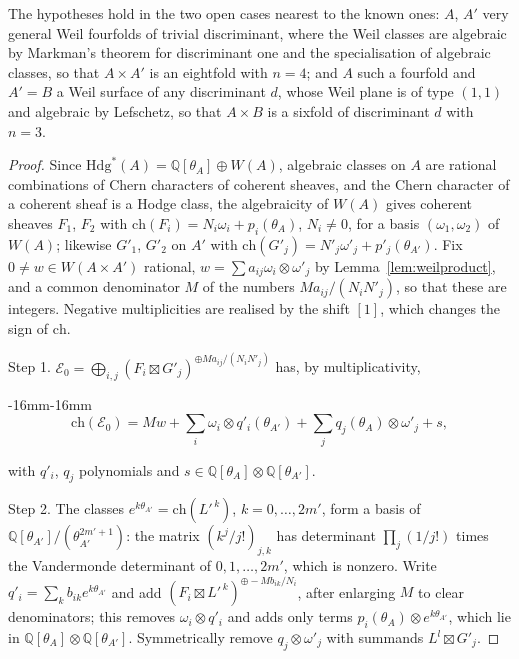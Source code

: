 \documentclass[11pt,reqno]{amsart}
\newenvironment{widetext}{\begin{adjustwidth}{-16mm}{-16mm}}{\end{adjustwidth}}
\numberwithin{equation}{section}
\theoremstyle{plain}
\theoremstyle{definition}
\newcommand{\QQ}{\mathbb{Q}}
\newcommand{\Hdg}{\mathrm{Hdg}}
\newcommand{\ch}{\mathrm{ch}}
\begin{document}
The hypotheses hold in the two open cases nearest to the known ones: $A$, $A'$ very general Weil fourfolds of trivial discriminant, where the Weil classes are algebraic by Markman's theorem for discriminant one \cite{Mar23} and the specialisation of algebraic classes, so that $A\times A'$ is an eightfold with $n=4$; and $A$ such a fourfold and $A'=B$ a Weil surface of any discriminant $d$, whose Weil plane is of type $(1,1)$ and algebraic by Lefschetz, so that $A\times B$ is a sixfold of discriminant $d$ with $n=3$.

\begin{proof}
Since $\Hdg^{*}(A)=\QQ[\theta_{A}]\oplus W(A)$, algebraic classes on $A$ are rational combinations of Chern characters of coherent sheaves, and the Chern character of a coherent sheaf is a Hodge class, the algebraicity of $W(A)$ gives coherent sheaves $F_{1}$, $F_{2}$ with $\ch(F_{i})=N_{i}\omega_{i}+p_{i}(\theta_{A})$, $N_{i}\ne0$, for a basis $(\omega_{1},\omega_{2})$ of $W(A)$; likewise $G'_{1}$, $G'_{2}$ on $A'$ with $\ch(G'_{j})=N'_{j}\omega'_{j}+p'_{j}(\theta_{A'})$. Fix $0\ne w\in W(A\times A')$ rational, $w=\sum a_{ij}\omega_{i}\otimes\omega'_{j}$ by Lemma~\ref{lem:weilproduct}, and a common denominator $M$ of the numbers $Ma_{ij}/(N_{i}N'_{j})$, so that these are integers. Negative multiplicities are realised by the shift $[1]$, which changes the sign of $\ch$.

Step 1. $\mathcal{E}_{0}=\bigoplus_{i,j}(F_{i}\boxtimes G'_{j})^{\oplus Ma_{ij}/(N_{i}N'_{j})}$ has, by multiplicativity,
\begin{widetext}
\begin{equation}\label{eq:chE0}
\ch(\mathcal{E}_{0})=Mw+\sum_{i}\omega_{i}\otimes q'_{i}(\theta_{A'})+\sum_{j}q_{j}(\theta_{A})\otimes\omega'_{j}+s,
\end{equation}
\end{widetext}
with $q'_{i}$, $q_{j}$ polynomials and $s\in\QQ[\theta_{A}]\otimes\QQ[\theta_{A'}]$.

Step 2. The classes $e^{k\theta_{A'}}=\ch(L'^{\,k})$, $k=0,\dots,2m'$, form a basis of $\QQ[\theta_{A'}]/(\theta_{A'}^{2m'+1})$: the matrix $(k^{j}/j!)_{j,k}$ has determinant $\prod_{j}(1/j!)$ times the Vandermonde determinant of $0,1,\dots,2m'$, which is nonzero. Write $q'_{i}=\sum_{k}b_{ik}e^{k\theta_{A'}}$ and add $(F_{i}\boxtimes L'^{\,k})^{\oplus-Mb_{ik}/N_{i}}$, after enlarging $M$ to clear denominators; this removes $\omega_{i}\otimes q'_{i}$ and adds only terms $p_{i}(\theta_{A})\otimes e^{k\theta_{A'}}$, which lie in $\QQ[\theta_{A}]\otimes\QQ[\theta_{A'}]$. Symmetrically remove $q_{j}\otimes\omega'_{j}$ with summands $L^{l}\boxtimes G'_{j}$.


\end{proof}
\end{document}
